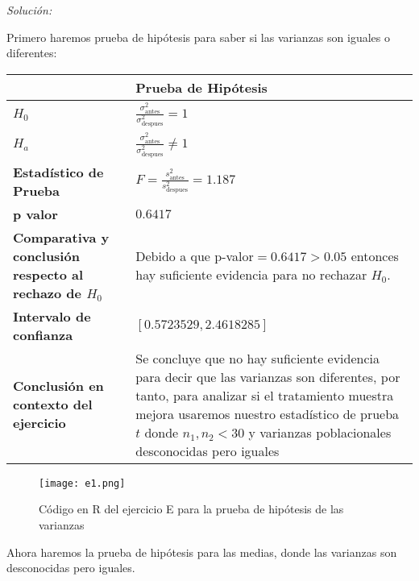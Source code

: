 \documentclass[12pt]{article}
\newenvironment{sol}
    {\emph{Solución:}
    }
    {
    }
\begin{document}
\begin{sol}
Primero haremos prueba de hipótesis para saber si las varianzas son iguales o diferentes:
\pagebreak
\begin{table}[h!]
\centering
\begin{tabular}{|>{\raggedright\arraybackslash}m{6cm}|>{\raggedright\arraybackslash}m{6cm}|}
\hline
 & \textbf{Prueba de Hipótesis} \\ \hline
$H_0$ & \vspace{0.5cm}$\frac{\sigma_{\text{antes}}^2}{\sigma_{\text{despues}
}^2}=1$ \vspace{0.5cm}\\ \hline
$H_a$ & \vspace{0.5cm} $\frac{\sigma_{\text{antes}}^2}{\sigma_{\text{despues}
}^2}\neq1$ \vspace{0.5cm}\\ \hline
\textbf{Estadístico de Prueba} & \vspace{0.5cm}$F = \frac{s_\text{antes}^2}{s_\text{despues}^2}= 1.187$\vspace{0.5cm} \\ \hline
\textbf{p valor} & $0.6417$ \\ \hline
\textbf{Comparativa y conclusión respecto al rechazo de $H_0$} & Debido a que p-valor$=0.6417>0.05$ entonces hay suficiente evidencia para no rechazar $H_0$. \\ \hline
\textbf{Intervalo de confianza} & $[0.5723529, 2.4618285]$ \\ \hline
\textbf{Conclusión en contexto del ejercicio} & Se concluye que no hay suficiente evidencia para decir que las varianzas son diferentes, por tanto, para analizar si el tratamiento muestra mejora usaremos nuestro estadístico de prueba $t$ donde $n_1 ,n_2 < 30$ y varianzas poblacionales desconocidas pero iguales \\ \hline
\end{tabular}
\label{tab:hipotesis}
\end{table}
\pagebreak

\begin{figure}[h]  %
    \centering      %
    \texttt{[image: e1.png]} 
    \caption{Código en R del ejercicio E para la prueba de hipótesis de las varianzas}
\end{figure}

Ahora haremos la prueba de hipótesis para las medias, donde las varianzas son desconocidas pero iguales.


\end{sol}
\end{document}
